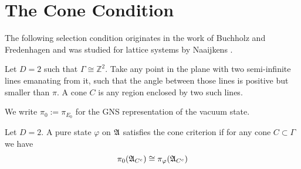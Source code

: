 \documentclass[11pt]{amsart}
\begin{document}
\section{The Cone Condition}
The following selection condition originates in the work of Buchholz and Fredenhagen \cite{buchholz_fredenhagen_1982} and was studied for lattice systems by Naaijkens \cite{naaijkens_2011, naaijkens_2013}.
\begin{defn}
    Let $D=2$ such that $\Gamma\cong\mathbb{Z}^2$. Take any point in the plane with two semi-infinite lines emanating from it, such that the angle between those lines is positive but smaller than $\pi$. A cone $C$ is any region enclosed by two such lines.  
\end{defn}
We write $\pi_0:=\pi_{E_0}$ for the GNS representation of the vacuum state.
\begin{defn}
    Let $D=2$. A pure state $\varphi$ on $\mathfrak{A}$  satisfies the cone criterion if for any cone $C \subset \Gamma$ we have
    \[
        \pi_0(\mathfrak{A}_{C^c})\cong \pi_\varphi(\mathfrak{A}_{C^c})
    \]
\end{defn}
\end{document}
